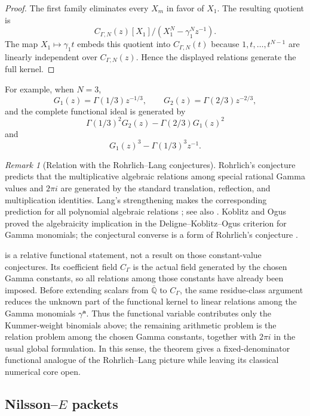 \documentclass[11pt]{article}
\numberwithin{equation}{section}
\theoremstyle{definition}
\theoremstyle{remark}
\newtheorem{remark}[remark]{Remark}
\newcommand{\Q}{\mathbb Q}
\begin{document}
\begin{proof}
The first family eliminates every $X_m$ in favor of $X_1$.  The resulting
quotient is
\[
  C_{\Gamma,N}(z)[X_1]/(X_1^N-\gamma_1^Nz^{-1}).
\]
The map $X_1\mapsto\gamma_1t$ embeds this quotient into
$C_{\Gamma,N}(t)$ because $1,t,\ldots,t^{N-1}$ are linearly independent
over $C_{\Gamma,N}(z)$.  Hence the
displayed relations generate the full kernel.
\end{proof}

For example, when $N=3$,
\[
  G_1(z)=\Gamma(1/3)z^{-1/3},
  \qquad
  G_2(z)=\Gamma(2/3)z^{-2/3},
\]
and the complete functional ideal is generated by
\[
  \Gamma(1/3)^2G_2(z)-\Gamma(2/3)G_1(z)^2
\]
and
\[
  G_1(z)^3-\Gamma(1/3)^3z^{-1}.
\]

\begin{remark}[Relation with the Rohrlich--Lang conjectures]
\label{rem:gamma-rohrlich-lang}
Rohrlich's conjecture predicts that the multiplicative algebraic relations among
special rational Gamma values and $2\pi i$ are generated by the standard
translation, reflection, and multiplication identities.  Lang's strengthening
makes the corresponding prediction for all polynomial algebraic relations
\cite[\S1.4]{AndersonBrownawellPapanikolas}; see also \cite{RivoalGamma}.
Koblitz and Ogus proved the algebraicity implication in the
Deligne--Koblitz--Ogus criterion for Gamma monomials; the conjectural converse
is a form of Rohrlich's conjecture \cite{KoblitzOgus}.

 is a relative functional statement,
not a result on those constant-value conjectures.  Its coefficient field
$C_\Gamma$ is the actual field generated by the chosen Gamma constants, so all
relations among those constants have already been imposed.  Before extending
scalars from $\overline{\Q}$ to $C_\Gamma$, the same residue-class argument
reduces the unknown part of the functional kernel to linear relations among the
Gamma monomials $\gamma^{\mathbf a}$.  Thus the functional variable contributes
only the Kummer-weight binomials above; the remaining arithmetic problem is
the relation problem among the chosen Gamma constants, together with $2\pi i$
in the usual global formulation.  In this sense,
the theorem gives a fixed-denominator functional analogue of the
Rohrlich--Lang picture while leaving its classical numerical core open.
\end{remark}

\subsection{\texorpdfstring{Nilsson--$E$ packets}{Nilsson--E packets}}
\end{document}
